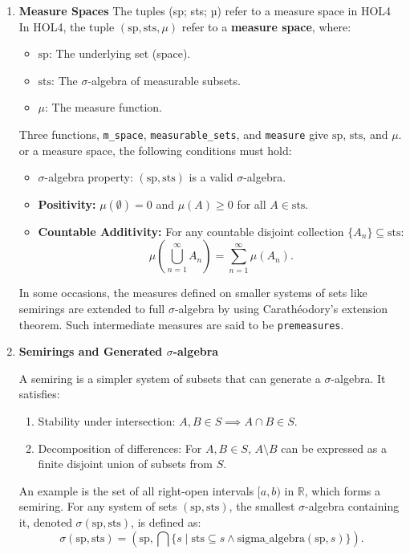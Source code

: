 \begin{enumerate}
    \item \textbf{Measure Spaces}
The tuples (sp; sts; µ) refer to a measure space in HOL4
In HOL4, the tuple \((\text{sp}, \text{sts}, \mu)\) refer to a \textbf{measure space}, where:
\begin{itemize}
    \item \(\text{sp}\): The underlying set (space).
    \item \(\text{sts}\): The \(\sigma\)-algebra of measurable subsets.
    \item \(\mu\): The measure function.
\end{itemize}

Three functions, \texttt{m\_space}, \texttt{measurable\_sets}, and \texttt{measure} give \(\text{sp}\), \(\text{sts}\), and \(\mu\). or a measure space, the following conditions must hold:
\begin{itemize}
    \item \(\sigma\)-algebra property: \((\text{sp}, \text{sts})\) is a valid \(\sigma\)-algebra.
    \item \textbf{Positivity:} \( \mu(\emptyset) = 0 \) and \( \mu(A) \geq 0 \) for all \( A \in \text{sts} \).
    \item \textbf{Countable Additivity:} For any countable disjoint collection \( \{A_n\} \subseteq \text{sts} \):
   \[
   \mu\left(\bigcup_{n=1}^\infty A_n\right) = \sum_{n=1}^\infty \mu(A_n).
   \]
\end{itemize}

In some occasions, the measures defined on smaller systems of sets like semirings are extended to full \(\sigma\)-algebra by using Carathéodory's extension theorem. Such intermediate measures are said to be \texttt{premeasures}.

\item \textbf{Semirings and Generated \(\sigma\)-algebra}

A semiring is a simpler system of subsets that can generate a \(\sigma\)-algebra. It satisfies:
\begin{enumerate}
    \item Stability under intersection: \( A, B \in S \implies A \cap B \in S \).
    \item Decomposition of differences: For \(A, B \in S\), \(A \setminus B\) can be expressed as a finite disjoint union of subsets from \(S\).
\end{enumerate}

An example is the set of all right-open intervals \([a, b)\) in \(\mathbb{R}\), which forms a semiring. For any system of sets \((\text{sp}, \text{sts})\), the smallest \(\sigma\)-algebra containing it, denoted \(\sigma(\text{sp}, \text{sts})\), is defined as:
\[
\sigma(\text{sp}, \text{sts}) = (\text{sp}, \bigcap \{s \mid \text{sts} \subseteq s \land \text{sigma\_algebra}(\text{sp}, s)\}).
\]


\end{enumerate}
